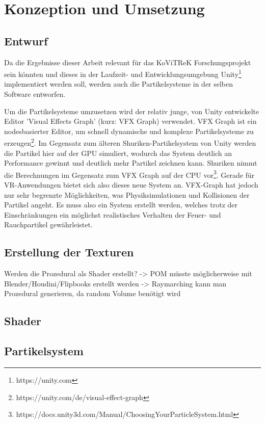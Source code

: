 \section{Konzeption und Umsetzung}
\label{sec:4}
\subsection{Entwurf}

Da die Ergebnisse dieser Arbeit relevant für das KoViTReK Forschungsprojekt sein könnten und dieses in der 
Laufzeit- und Entwicklungsumgebung Unity\footnote{https://unity.com} implementiert werden soll, werden auch die Partikelsysteme in der selben 
Software entworfen. 

Um die Partikelsysteme umzusetzen wird der relativ junge, von Unity entwickelte Editor 'Visual Effects Graph' 
(kurz: VFX Graph) verwendet. VFX Graph ist ein nodesbasierter Editor, um schnell
dynamische und komplexe Partikelsysteme zu erzeugen\footnote{https://unity.com/de/visual-effect-graph}.
Im Gegensatz zum älteren Shuriken-Partikelsystem von Unity werden die Partikel hier auf der GPU
simuliert, wodurch das System deutlich an Performance gewinnt und deutlich mehr Partikel zeichnen kann. 
Shuriken nimmt die Berechnungen im Gegensatz zum VFX Graph auf der CPU vor\footnote{https://docs.unity3d.com/Manual/ChoosingYourParticleSystem.html}. 
Gerade für VR-Anwendungen bietet sich also dieses neue System an.
VFX-Graph hat jedoch nur sehr begrenzte Möglichkeiten, was Physiksimulationen und Kollisionen der Partikel angeht. 
Es muss also ein System erstellt werden, welches trotz der Einschränkungen ein möglichst realistisches Verhalten der Feuer- und Rauchpartikel 
gewährleistet.  


\subsection{Erstellung der Texturen}

Werden die Prozedural als Shader erstellt? 
-> POM müsste möglicherweise mit Blender/Houdini/Flipbooks erstellt werden
-> Raymarching kann man Prozedural generieren, da random Volume benötigt wird

\subsection{Shader}

\subsection{Partikelsystem}





\newpage
